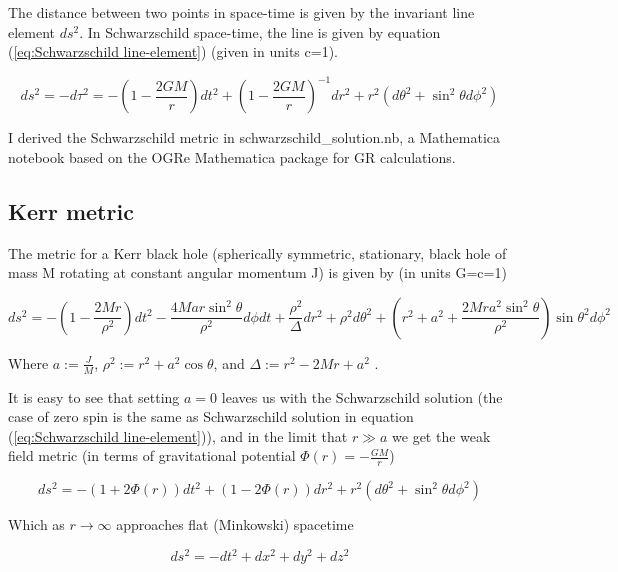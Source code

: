 \documentclass{article}
\begin{document}
The distance between two points in space-time is given by the invariant line element $ds^2$. In Schwarzschild space-time, the line is given by equation (\ref{eq:Schwarzschild line-element}) (given in units c=1).

\begin{equation}
    ds^2 = - d\tau^2 = - (1-\frac{2 G M}{r}) dt^2 +  (1-\frac{2 G M}{r})^{-1} dr^2
            + r^2 (d\theta^2+\sin^2\theta d\phi^2)
\label{eq:Schwarzschild line-element}
\end{equation}

I derived the Schwarzschild metric in schwarzschild\_solution.nb, a Mathematica notebook based on the OGRe Mathematica package \cite{Shoshany2021_OGRe} for GR calculations.

\subsection{Kerr metric}

The metric for a Kerr black hole (spherically symmetric, stationary, black hole of mass M rotating at constant angular momentum J) is given by (in units G=c=1)

\begin{equation}\label{eq:Kerr metric}
    ds^2 = -\left(1-\frac{2Mr}{\rho^2}\right) dt^2-\frac{4Mar \sin^2{\theta}}{\rho^2} d\phi dt+ \frac{\rho^2}{\Delta} dr^2 + \rho^2 d\theta^2 +\left(r^2+a^2+
    \frac{2Mra^2\sin^2{\theta}}{\rho^2}
    \right)\sin{\theta}^2 d\phi^2
\end{equation}

Where $a:=\frac{J}{M}$, $\rho^2:=r^2+a^2 \cos{\theta}$, and $\Delta:=r^2-2Mr+a^2$ \cite{carroll2019spacetime}.

It is easy to see that setting $a=0$ leaves us with the Schwarzschild solution (the case of zero spin is the same as Schwarzschild solution in equation (\ref{eq:Schwarzschild line-element})), and in the limit that $r \gg a$ we get the weak field metric (in terms of gravitational potential $\Phi(r)=-\frac{G M}{r}$)

\begin{equation}
    ds^2 = - (1+2\Phi(r)) dt^2 +  (1-2\Phi(r)) dr^2
            + r^2 (d\theta^2+\sin^2\theta d\phi^2)
\label{eq:Weak field metric}
\end{equation}

Which as $r\rightarrow \infty$ approaches flat (Minkowski) spacetime

\begin{equation}
    ds^2 = - dt^2 + dx^2 + dy^2 + dz^2
\label{eq:Minkowski metruc}
\end{equation}
\end{document}
